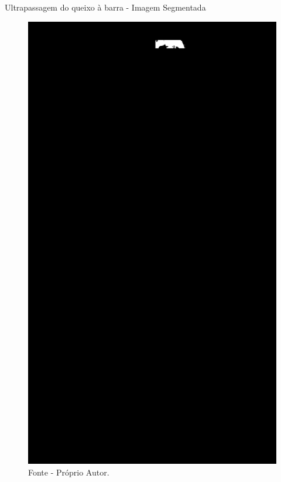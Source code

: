 \begin{frame}{Ultrapassagem do queixo à barra - Imagem Segmentada}
    \begin{figure}[!ht]
        \centering
            \includegraphics[scale=0.1]{img/desenvolvimento/ultrapassagemBarra/only_interesse.png}
        \caption*{Fonte - Próprio Autor.}
    \end{figure}
\end{frame}



